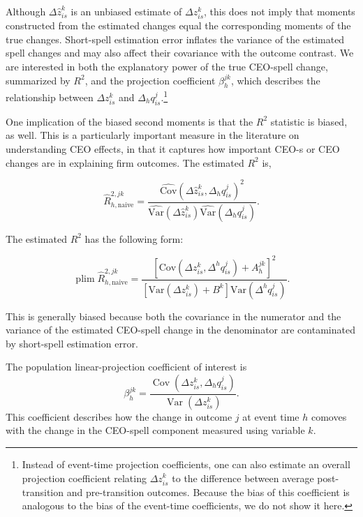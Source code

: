 \documentclass[11pt,a4paper]{article}
\newcommand{\Var}{\text{Var}}
\newcommand{\Cov}{\text{Cov}}
\DeclareMathOperator*{\plim}{plim}
\begin{document}
Although $\Delta\widehat z_{is}^{k}$ is an unbiased estimate of
$\Delta z_{is}^{k}$, this does not imply that moments constructed from
the estimated changes equal the corresponding moments of the true
changes. Short-spell estimation error inflates the variance of the
estimated spell changes and may also affect their covariance with the
outcome contrast. We are interested in both the explanatory power of the true CEO-spell
change, summarized by $R^2$, and the projection coefficient
$\beta_h^{jk}$, which describes the relationship between
$\Delta z_{is}^{k}$ and $\Delta_h q_{is}^{j}$.\footnote{Instead of
event-time projection coefficients, one can also estimate an overall
projection coefficient relating $\Delta z_{is}^{k}$ to the difference
between average post-transition and pre-transition outcomes. Because
the bias of this coefficient is analogous to the bias of the event-time
coefficients, we do not show it here.}

One implication of the biased second moments is that the $R^2$ statistic is biased, as well. This is a particularly important measure in the literature on understanding CEO effects, in that it captures how important CEO-s or CEO changes are in explaining firm outcomes. The estimated $R^2$ is, 

\begin{equation}
\widehat R^{2,jk}_{h,\mathrm{naive}}
=
\frac{
\widehat{\Cov}\!\left(\Delta \hat z^{k}_{is},\Delta_{h} q^{j}_{is}\right)^2
}{
\widehat{\Var}\!\left(\Delta \hat z^{k}_{is}\right)
\widehat{\Var}\!\left(\Delta_{h} q^{j}_{is}\right)
}.
\end{equation}

The estimated $R^2$ has the following form:

\begin{equation}
\plim \widehat R^{2,jk}_{h,\mathrm{naive}}
=
\frac{
\left[
\Cov\!\left(\Delta z^k_{is},\Delta^h q^j_{is}\right)
+A_h^{jk}
\right]^2
}{
\left[
\Var\!\left(\Delta z^k_{is}\right)
+B^k
\right]
\Var\!\left(\Delta^h q^j_{is}\right)
}.
\end{equation}

This is generally biased because both the covariance in the numerator and the variance of the estimated CEO-spell change in the denominator are contaminated by short-spell estimation error.


The population linear-projection coefficient of interest is
\begin{equation}
\beta_h^{jk}
=
\frac{
\operatorname{Cov}\!\left(
\Delta z_{is}^{k},
\Delta_h q_{is}^{j}
\right)
}{
\operatorname{Var}\!\left(
\Delta z_{is}^{k}
\right)
}.
\label{eq:population_beta}
\end{equation}
This coefficient describes how the change in outcome $j$ at event time
$h$ comoves with the change in the CEO-spell component measured using
variable $k$.
\end{document}
